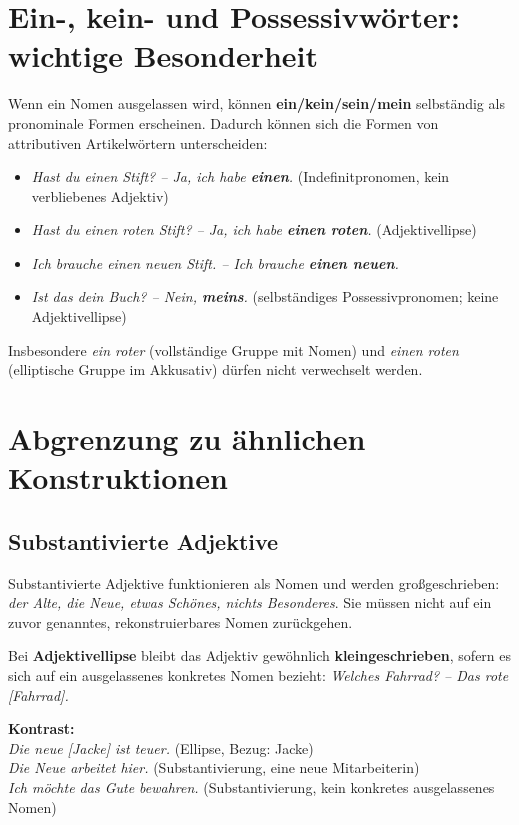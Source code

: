 \documentclass[a4paper,11pt]{article}
\begin{document}
\section{Ein-, kein- und Possessivwörter: wichtige Besonderheit}
Wenn ein Nomen ausgelassen wird, können \textbf{ein/kein/sein/mein} selbständig als pronominale Formen erscheinen. Dadurch können sich die Formen von attributiven Artikelwörtern unterscheiden:
\begin{itemize}
\item \textit{Hast du einen Stift? -- Ja, ich habe \textbf{einen}.} (Indefinitpronomen, kein verbliebenes Adjektiv)
\item \textit{Hast du einen roten Stift? -- Ja, ich habe \textbf{einen roten}.} (Adjektivellipse)
\item \textit{Ich brauche einen neuen Stift. -- Ich brauche \textbf{einen neuen}.}
\item \textit{Ist das dein Buch? -- Nein, \textbf{meins}.} (selbständiges Possessivpronomen; keine Adjektivellipse)
\end{itemize}
Insbesondere \textit{ein roter} (vollständige Gruppe mit Nomen) und \textit{einen roten} (elliptische Gruppe im Akkusativ) dürfen nicht verwechselt werden.

\section{Abgrenzung zu ähnlichen Konstruktionen}
\subsection{Substantivierte Adjektive}
Substantivierte Adjektive funktionieren als Nomen und werden großgeschrieben: \textit{der Alte, die Neue, etwas Schönes, nichts Besonderes}. Sie müssen nicht auf ein zuvor genanntes, rekonstruierbares Nomen zurückgehen.

Bei \textbf{Adjektivellipse} bleibt das Adjektiv gewöhnlich \textbf{kleingeschrieben}, sofern es sich auf ein ausgelassenes konkretes Nomen bezieht: \textit{Welches Fahrrad? -- Das rote [Fahrrad].}

\textbf{Kontrast:}\\
\textit{Die neue [Jacke] ist teuer.} (Ellipse, Bezug: Jacke)\\
\textit{Die Neue arbeitet hier.} (Substantivierung, eine neue Mitarbeiterin)\\
\textit{Ich möchte das Gute bewahren.} (Substantivierung, kein konkretes ausgelassenes Nomen)
\end{document}
